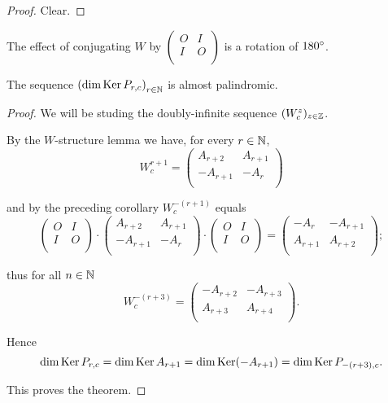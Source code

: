 \begin{proof}
  Clear.
\end{proof}

\begin{remark}
  The effect of conjugating $W$ by
  $\left(\begin{smallmatrix} O & I \\ I & O \\\end{smallmatrix}\right)$
  is a rotation of $180^{\circ}$.
\end{remark}

\begin{theorem}
  The sequence $\left(\dim\operatorname{Ker} P_{r,c}\right)_{r\in\mathbb{N}}$
  is almost palindromic.
\end{theorem}

\begin{proof}
  We will be studing the doubly-infinite sequence
  $(W_{c}^{z})_{z\in\mathbb{Z}}$.

  By the $W$-structure lemma we have, for every $r\in\mathbb{N}$,
  \[
  W_{c}^{r+1}
  =
  \left(
  \begin{array}{cc}
     A_{r+2} &  A_{r+1} \\
    -A_{r+1} & -A_{r}   \\
  \end{array}
  \right)
  \]

  and by the preceding corollary $W_{c}^{-(r+1)}$ equals
  \[
  \left(
  \begin{array}{cc}
    O & I \\
    I & O \\
  \end{array}
  \right)
  \cdot
  \left(
  \begin{array}{cc}
     A_{r+2} &  A_{r+1} \\
    -A_{r+1} & -A_{r}   \\
  \end{array}
  \right)
  \cdot
  \left(
  \begin{array}{cc}
    O & I \\
    I & O \\
  \end{array}
  \right)
  =
  \left(
  \begin{array}{cc}
    -A_{r}  & -A_{r+1} \\
     A_{r+1} & A_{r+2} \\
  \end{array}
  \right);
  \]

  thus for all $n\in\mathbb{N}$
  \[
  W_{c}^{-(r+3)}
  =
  \left(
  \begin{array}{cc}
    -A_{r+2}  & -A_{r+3} \\
     A_{r+3} & A_{r+4} \\
  \end{array}
  \right).
  \]

  Hence
  \[
  \dim\operatorname{Ker} P_{r,c} =
  \dim\operatorname{Ker} A_{r+1} =
  \dim\operatorname{Ker}(-A_{r+1}) =
  \dim\operatorname{Ker} P_{-(r+3),c}.
  \]

  This proves the theorem.
\end{proof}
